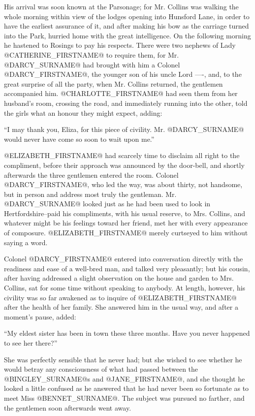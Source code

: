 His arrival was soon known at the Parsonage; for Mr. Collins was walking
the whole morning within view of the lodges opening into Hunsford Lane,
in order to have the earliest assurance of it, and after making his
bow as the carriage turned into the Park, hurried home with the great
intelligence. On the following morning he hastened to Rosings to pay his
respects. There were two nephews of Lady @CATHERINE_FIRSTNAME@ to require them, for
Mr. @DARCY_SURNAME@ had brought with him a Colonel @DARCY_FIRSTNAME@, the younger son of
his uncle Lord ----, and, to the great surprise of all the party, when
Mr. Collins returned, the gentlemen accompanied him. @CHARLOTTE_FIRSTNAME@ had seen
them from her husband's room, crossing the road, and immediately running
into the other, told the girls what an honour they might expect, adding:

``I may thank you, Eliza, for this piece of civility. Mr. @DARCY_SURNAME@ would
never have come so soon to wait upon me.''

@ELIZABETH_FIRSTNAME@ had scarcely time to disclaim all right to the compliment,
before their approach was announced by the door-bell, and shortly
afterwards the three gentlemen entered the room. Colonel @DARCY_FIRSTNAME@,
who led the way, was about thirty, not handsome, but in person and
address most truly the gentleman. Mr. @DARCY_SURNAME@ looked just as he had been
used to look in Hertfordshire--paid his compliments, with his usual
reserve, to Mrs. Collins, and whatever might be his feelings toward her
friend, met her with every appearance of composure. @ELIZABETH_FIRSTNAME@ merely
curtseyed to him without saying a word.

Colonel @DARCY_FIRSTNAME@ entered into conversation directly with the
readiness and ease of a well-bred man, and talked very pleasantly; but
his cousin, after having addressed a slight observation on the house and
garden to Mrs. Collins, sat for some time without speaking to anybody.
At length, however, his civility was so far awakened as to inquire of
@ELIZABETH_FIRSTNAME@ after the health of her family. She answered him in the usual
way, and after a moment's pause, added:

``My eldest sister has been in town these three months. Have you never
happened to see her there?''

She was perfectly sensible that he never had; but she wished to see
whether he would betray any consciousness of what had passed between
the @BINGLEY_SURNAME@s and @JANE_FIRSTNAME@, and she thought he looked a little confused as he
answered that he had never been so fortunate as to meet Miss @BENNET_SURNAME@. The
subject was pursued no farther, and the gentlemen soon afterwards went
away.



